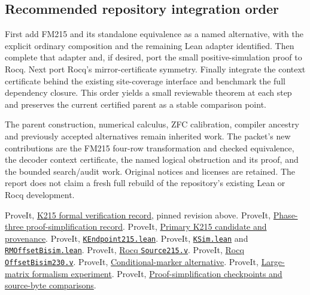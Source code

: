 \documentclass[11pt,a4paper]{article}
\newcommand{\repo}[2]{\href{https://github.com/VladimirReshetnikov/ProveIt/blob/b6c7087477e51c017003bd729e712c8969733223/#1}{#2}}
\begin{document}
\subsection{Recommended repository integration order}

First add FM215 and its standalone equivalence as a named alternative,
with the explicit ordinary composition and the remaining Lean adapter
identified. Then complete that adapter and, if desired, port the small
positive-simulation proof to Rocq. Next port Rocq's mirror-certificate
symmetry. Finally integrate the context certificate behind the existing
site-coverage interface and benchmark the full dependency closure.
This order yields a small reviewable theorem at each step and preserves
the current certified parent as a stable comparison point.

The parent construction, numerical calculus, ZFC calibration, compiler
ancestry and previously accepted alternatives remain inherited work.
The packet's new contributions are the FM215 four-row transformation and
checked equivalence, the decoder context certificate, the named logical
obstruction and its proof, and the bounded search/audit work. Original
notices and licenses are retained. The report does not claim a fresh full
rebuild of the repository's existing Lean or Rocq development.

\begin{thebibliography}{10}
ProveIt, \repo{Computability/BusyBeaver/Research/ZFC/k225-formal/verification/k215/README.md}{K215 formal verification record}, pinned revision above.
ProveIt, \repo{Computability/BusyBeaver/Research/ZFC/k225-formal/verification/k215/simplification/phase3/README.md}{Phase-three proof-simplification record}.
ProveIt, \repo{Computability/BusyBeaver/Research/ZFC/candidate-k215/README.md}{Primary K215 candidate and provenance}.
ProveIt, \repo{Computability/BusyBeaver/Lean/BusyBeaver/ZFC/KEndpoint215.lean}{\texttt{KEndpoint215.lean}}.
ProveIt, \repo{Computability/BusyBeaver/Lean/BusyBeaver/ZFC/KSim.lean}{\texttt{KSim.lean}} and
\repo{Computability/BusyBeaver/Lean/BusyBeaver/ZFC/RMOffsetBisim.lean}{\texttt{RMOffsetBisim.lean}}.
ProveIt, \repo{Computability/BusyBeaver/Research/ZFC/k225-formal/rocq/rocq-extension/coq/215/Source215.v}{Rocq \texttt{Source215.v}}.
ProveIt, \repo{Computability/BusyBeaver/Research/ZFC/k225-formal/rocq/rocq-extension/coq/215/OffsetBisim230.v}{Rocq \texttt{OffsetBisim230.v}}.
ProveIt, \repo{Computability/BusyBeaver/Research/ZFC/candidate-k215/alternatives/conditional-marker/README.md}{Conditional-marker alternative}.
ProveIt, \repo{Computability/BusyBeaver/Research/ZFC/candidate-k215/alternatives/rebalanced/research/formalism/formalism_supplement.tex}{Large-matrix formalism experiment}.
ProveIt, \repo{Computability/BusyBeaver/Research/ZFC/k225-formal/verification/k215/simplification/README.md}{Proof-simplification checkpoints and source-byte comparisons}.
\end{thebibliography}
\end{document}
